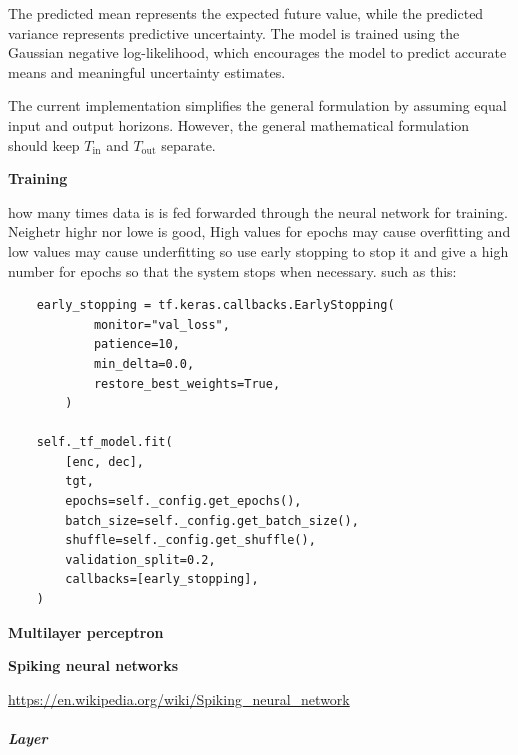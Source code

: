 \documentclass{book}
\providecommand{\ProjectDeepHeading}[2]{%
    \par\medskip\noindent\textbf{#2}\par\smallskip
}
\begin{document}
        The predicted mean represents the expected future value, while the predicted variance represents predictive uncertainty. The model is trained using the Gaussian negative log-likelihood, which encourages the model to predict accurate means and meaningful uncertainty estimates.
        
        The current implementation simplifies the general formulation by assuming equal input and output horizons. However, the general mathematical formulation should keep \(T_{\mathrm{in}}\) and \(T_{\mathrm{out}}\) separate.

\ProjectDeepHeading{2}{Training}


how many times data is is fed forwarded through the neural network for training. Neighetr highr nor lowe is good, High values for epochs may cause overfitting and low values may cause underfitting so use early stopping to stop it and give a high number for epochs so that the system stops when necessary. such as this:
\begin{verbatim}
    early_stopping = tf.keras.callbacks.EarlyStopping(
            monitor="val_loss",
            patience=10,
            min_delta=0.0,
            restore_best_weights=True,
        )

    self._tf_model.fit(
        [enc, dec],
        tgt,
        epochs=self._config.get_epochs(),
        batch_size=self._config.get_batch_size(),
        shuffle=self._config.get_shuffle(),
        validation_split=0.2,
        callbacks=[early_stopping],
    )
\end{verbatim}

\ProjectDeepHeading{1}{Multilayer perceptron}


% 

\ProjectDeepHeading{1}{Spiking neural networks}


\url{https://en.wikipedia.org/wiki/Spiking_neural_network}

\subparagraph{Layer}

\end{document}
